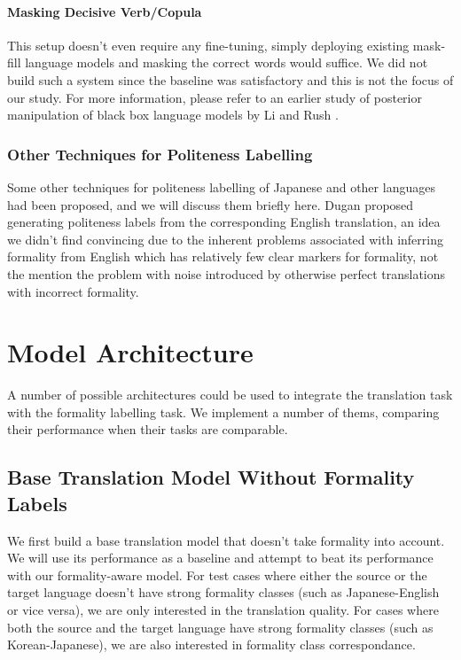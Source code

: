 \documentclass[11pt]{article}
\begin{document}
\paragraph{Masking Decisive Verb/Copula}

This setup doesn't even require any fine-tuning, simply deploying existing mask-fill language models and masking the correct words would suffice. We did not build such a system since the baseline was satisfactory and this is not the focus of our study. For more information, please refer to an earlier study of posterior manipulation of black box language models by Li and Rush \cite{DBLP:journals/corr/abs-2005-04560}.

\subsubsection{Other Techniques for Politeness Labelling}

Some other techniques for politeness labelling of Japanese and other languages had been proposed, and we will discuss them briefly here. Dugan \cite{Dugan:20} proposed generating politeness labels from the corresponding English translation, an idea we didn't find convincing due to the inherent problems associated with inferring formality from English which has relatively few clear markers for formality, not the mention the problem with noise introduced by otherwise perfect translations with incorrect formality.

\section{Model Architecture}

A number of possible architectures could be used to integrate the translation task with the formality labelling task. We implement a number of thems, comparing their performance when their tasks are comparable.

\subsection{Base Translation Model Without Formality Labels}

We first build a base translation model that doesn't take formality into account. We will use its performance as a baseline and attempt to beat its performance with our formality-aware model. For test cases where either the source or the target language doesn't have strong formality classes (such as Japanese-English or vice versa), we are only interested in the translation quality. For cases where both the source and the target language have strong formality classes (such as Korean-Japanese), we are also interested in formality class correspondance.
\end{document}
